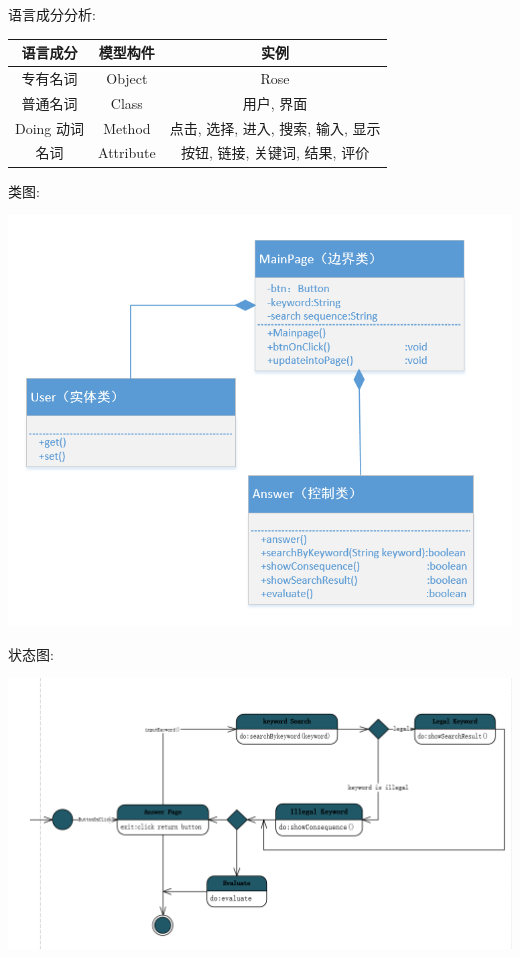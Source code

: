 \documentclass[11pt]{article}
\begin{document}
			语言成分分析: \\
			\begin{center}
			\begin{tabular}{|c|c|c|}
			\hline
			语言成分 & 模型构件 & 实例\\ \hline
			专有名词 & Object & Rose  \\ \hline
			普通名词 & Class & 用户, 界面 \\ \hline
			Doing 动词 & Method & 点击, 选择, 进入, 搜索, 输入, 显示 \\ \hline
			名词 & Attribute & 按钮, 链接, 关键词, 结果, 评价 \\ \hline
			\end{tabular}
			\end{center}
			
			类图: 
			\begin{center}
			\includegraphics[scale=0.42]{4.1类图.png}
			\end{center}
			
			状态图: 
			\begin{center}
			\includegraphics[scale=0.42]{4.1状态图.png}
			\end{center}
\end{document}
